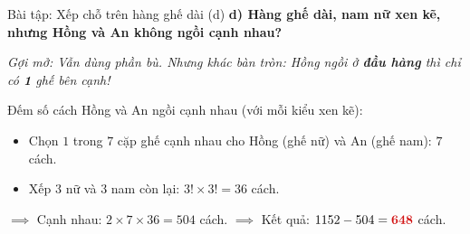 \documentclass[12pt,a4paper]{article}
\begin{document}
\begin{baitap}{Bài tập: Xếp chỗ trên hàng ghế dài (d)}
\textbf{d) Hàng ghế dài, nam nữ xen kẽ, nhưng Hồng và An không ngồi cạnh nhau?}

\textit{Gợi mở: Vẫn dùng phần bù. Nhưng khác bàn tròn: Hồng ngồi ở \textbf{đầu hàng} thì chỉ có \textbf{1} ghế bên cạnh!}

\begin{center}
\end{center}

Đếm số cách Hồng và An ngồi cạnh nhau (với mỗi kiểu xen kẽ):
\begin{itemize}
  \item Chọn $1$ trong $7$ cặp ghế cạnh nhau cho Hồng (ghế nữ) và An (ghế nam): $7$ cách.
  \item Xếp $3$ nữ và $3$ nam còn lại: $3! \times 3! = 36$ cách.
\end{itemize}
$\implies$ Cạnh nhau: $2 \times 7 \times 36 = 504$ cách. \qquad
$\implies$ Kết quả: $1152 - 504 = \textcolor{AccentRed}{\mathbf{648}}$ cách.
\end{baitap}
\end{document}
